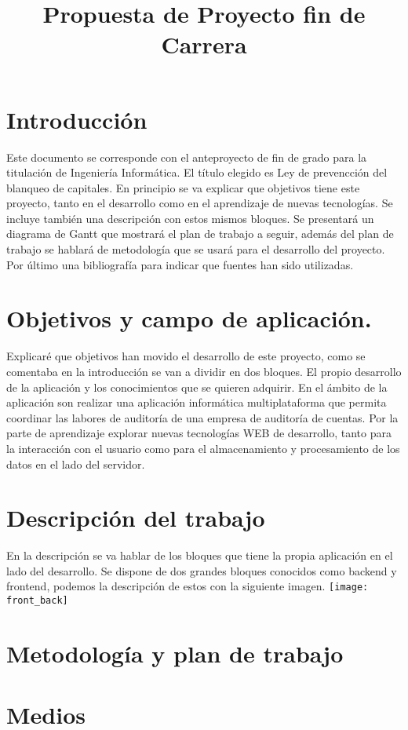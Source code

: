 \documentclass{article}
\begin{document}
\title{Propuesta de Proyecto fin de Carrera}
\setcounter{page}{2}
\cleardoublepage

\setcounter{tocdepth}{2}
\tableofcontents
\listoffixmes



\section{Introducción}
Este documento se corresponde con el anteproyecto de fin de grado para la titulación de Ingeniería Informática. El título elegido es Ley de prevencción del blanqueo de capitales.
En principio se va explicar que objetivos tiene este proyecto, tanto en el desarrollo como en el aprendizaje de nuevas tecnologías. Se incluye también una descripción con estos mismos bloques.
Se presentará un diagrama de Gantt que mostrará el plan de trabajo a seguir, además del plan de trabajo se hablará de metodología que se usará para el desarrollo del proyecto.
Por último una bibliografía para indicar que fuentes han sido utilizadas.  


 


\section{Objetivos y campo de aplicación.}
Explicaré que objetivos han movido el desarrollo de este proyecto, como se comentaba en la introducción se van a dividir en dos bloques. El propio desarrollo de la aplicación y los conocimientos que se quieren adquirir.
En el ámbito de la aplicación son realizar una aplicación informática multiplataforma que permita coordinar las labores de auditoría de una empresa de auditoría de cuentas.
Por la parte de aprendizaje explorar nuevas tecnologías WEB de desarrollo, tanto para la interacción con el usuario como para el almacenamiento y procesamiento de los datos en el lado del servidor.



\section{Descripción del trabajo}
En la descripción se va hablar de los bloques que tiene la propia aplicación en el lado del desarrollo. Se dispone de dos grandes bloques conocidos como backend y frontend, podemos la descripción de estos con la siguiente imagen.
\texttt{[image: front\_back]}






\section{Metodología y plan de trabajo}



\section{Medios}




\nocite{*}

\end{document}
